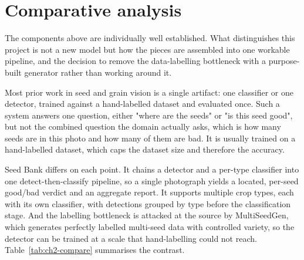 \section{Comparative analysis}

The components above are individually well established. What distinguishes this
project is not a new model but how the pieces are assembled into one workable
pipeline, and the decision to remove the data-labelling bottleneck with a
purpose-built generator rather than working around it.

Most prior work in seed and grain vision is a single artifact: one classifier or
one detector, trained against a hand-labelled dataset and evaluated once. Such a
system answers one question, either "where are the seeds" or "is this seed good",
but not the combined question the domain actually asks, which is how many seeds
are in this photo and how many of them are bad. It is usually trained on a
hand-labelled dataset, which caps the dataset size and therefore the accuracy.

Seed Bank differs on each point. It chains a detector and a per-type classifier
into one detect-then-classify pipeline, so a single photograph yields a located,
per-seed good/bad verdict and an aggregate report. It supports multiple crop
types, each with its own classifier, with detections grouped by type before the
classification stage. And the labelling bottleneck is attacked at the source by
MultiSeedGen, which generates perfectly labelled multi-seed data with controlled
variety, so the detector can be trained at a scale that hand-labelling could not
reach. Table~\ref{tab:ch2-compare} summarises the contrast.

